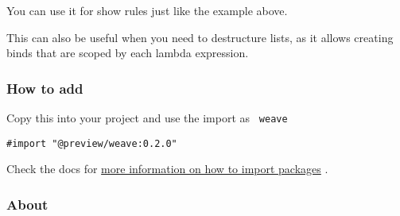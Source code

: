 You can use it for show rules just like the example above.

\begin{Shaded}
\begin{Highlighting}[]
\NormalTok{))}
\end{Highlighting}
\end{Shaded}

This can also be useful when you need to destructure lists, as it allows
creating binds that are scoped by each lambda expression.

\begin{Shaded}
\begin{Highlighting}[]
\NormalTok{  (}
\NormalTok{  ),}
\NormalTok{)}
\end{Highlighting}
\end{Shaded}

\subsubsection{How to add}\label{how-to-add}

Copy this into your project and use the import as \texttt{\ weave\ }

\begin{verbatim}
#import "@preview/weave:0.2.0"
\end{verbatim}



Check the docs for
\href{https://typst.app/docs/reference/scripting/\#packages}{more
information on how to import packages} .

\subsubsection{About}\label{about}

